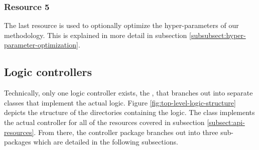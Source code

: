 \documentclass[12pt,a4paper]{report}
\begin{document}
\subsubsection{Resource 5}
The last resource is used to optionally optimize the hyper\hyp parameters of our methodology.
This is explained in more detail in subsection \ref{subsubsect:hyper-parameter-optimization}.


\subsection{Logic controllers}

Technically, only one logic controller exists, the , that
branches out into separate classes that implement the actual logic.
Figure \ref{fig:top-level-logic-structure} depicts the structure of the directories
containing the logic.
The  class implements the actual controller for all of the
 resources covered in subsection \ref{subsect:api-resources}.
From there, the  controller package branches out into three sub-packages
which are detailed in the following subsections.
\end{document}
